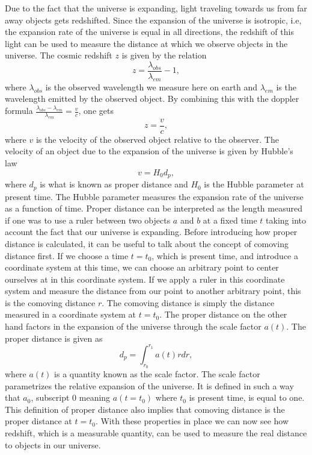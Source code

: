 Due to the fact that the universe is expanding, light traveling towards us from
far away objects gets redshifted. Since the expansion of the universe is
isotropic, i.e, the expansion rate of the universe is equal in all directions,
the redshift of this light can be used to measure the distance at which we
observe objects in the universe. The cosmic redshift $z$ is given by the
relation
\begin{equation}
    z = \frac{\lambda_{obs}}{\lambda_{em}} - 1,
\end{equation}
where $\lambda_{obs}$ is the observed wavelength we measure here on earth and
$\lambda_{em}$ is the wavelength emitted by the observed object. By combining this with the doppler formula
$\frac{\lambda_{obs}-\lambda_{em}}{\lambda_{em}} = \frac{v}{c}$, one gets
\begin{equation}
    z = \frac{v}{c},
\end{equation}
where $v$ is the velocity of the observed object relative to the observer. The
velocity of an object due to the expansion of the universe is given by Hubble's law
\begin{equation}
    v = H_0 d_p,
\end{equation}
where $d_p$ is what is known as proper distance and $H_0$ is the Hubble
parameter at present time. The Hubble parameter measures the expansion rate of
the universe as a function of time. Proper distance can be interpreted as the length measured if one
was to use a ruler between two objects $a$ and $b$ at a fixed time $t$ taking
into account the fact that our universe is expanding. Before introducing how proper distance is calculated, it can be
useful to talk about the concept of comoving distance first. If we choose a time
$t=t_0$, which is present time, and introduce a coordinate system at this time,
we can choose an arbitrary point to center ourselves at in this coordinate
system. If we apply a ruler in this coordinate system and measure the distance
from our point to another arbitrary point, this is the comoving distance $r$. The
comoving distance is simply the distance measured in a coordinate system at
$t=t_0$. The proper distance on the other hand factors in the expansion of the
universe through the scale factor $a(t)$. The proper distance is given as
\begin{equation}
    d_p = \int_{r_0}^{r_1}a(t)rdr,
\end{equation}
where $a(t)$ is a quantity known as the scale factor. The scale factor parametrizes the relative expansion of the
universe. It is defined in such a way that $a_0$, subscript $0$ meaning
$a(t=t_0)$ where $t_0$ is present time, is equal to one. This definition of
proper distance also implies that comoving distance is the proper distance at $t=t_0$.
With these properties in place we can now see how redshift, which is a
measurable quantity, can be used to measure the real distance to objects in our universe.\\

